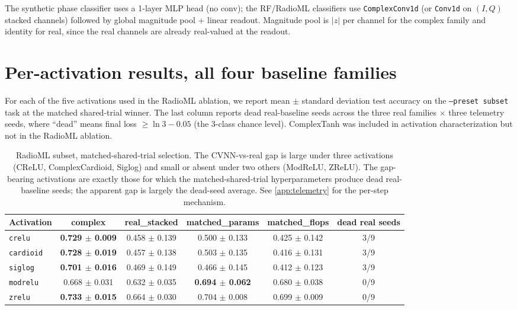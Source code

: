 \documentclass{article}
\providecommand{\Cref}[1]{\autoref{#1}}
\newcommand{\code}[1]{\texttt{#1}}
\begin{document}
The synthetic phase classifier uses a 1-layer MLP head (no conv); the
RF/RadioML classifiers use \code{ComplexConv1d} (or \code{Conv1d} on
$(I,Q)$ stacked channels) followed by global magnitude pool + linear
readout. Magnitude pool is $|z|$ per channel for the complex family
and identity for real, since the real channels are already real-valued
at the readout.

\section{Per-activation results, all four baseline families}
\label{app:per-activation-results}

For each of the five activations used in the RadioML ablation, we
report mean $\pm$ standard deviation test accuracy on the
\code{--preset subset} task at the matched shared-trial winner. The
last column reports dead real-baseline seeds across the three real
families $\times$ three telemetry seeds, where ``dead'' means final
loss $\geq \ln 3 - 0.05$ (the 3-class chance level). ComplexTanh was
included in activation characterization but not in the RadioML
ablation.

\begin{table}[h]
\centering
\small
\begin{tabular}{lccccc}
\toprule
\textbf{Activation} & \textbf{complex} & \textbf{real\_stacked} & \textbf{matched\_params} & \textbf{matched\_flops} & \textbf{dead real seeds} \\
\midrule
\code{crelu}    & \textbf{0.729 $\pm$ 0.009} & 0.458 $\pm$ 0.139 & 0.500 $\pm$ 0.133 & 0.425 $\pm$ 0.142 & 3/9 \\
\code{cardioid} & \textbf{0.728 $\pm$ 0.019} & 0.457 $\pm$ 0.138 & 0.503 $\pm$ 0.135 & 0.416 $\pm$ 0.131 & 3/9 \\
\code{siglog}   & \textbf{0.701 $\pm$ 0.016} & 0.469 $\pm$ 0.149 & 0.466 $\pm$ 0.145 & 0.412 $\pm$ 0.123 & 3/9 \\
\code{modrelu}  & 0.668 $\pm$ 0.031 & 0.632 $\pm$ 0.035 & \textbf{0.694 $\pm$ 0.062} & 0.680 $\pm$ 0.038 & 0/9 \\
\code{zrelu}    & \textbf{0.733 $\pm$ 0.015} & 0.664 $\pm$ 0.030 & 0.704 $\pm$ 0.008 & 0.699 $\pm$ 0.009 & 0/9 \\
\bottomrule
\end{tabular}
\caption{RadioML subset, matched-shared-trial selection. The
CVNN-vs-real gap is large under three activations (CReLU,
ComplexCardioid, Siglog) and small or absent under two others
(ModReLU, ZReLU). The gap-bearing activations are exactly those for
which the matched-shared-trial hyperparameters produce dead
real-baseline seeds; the apparent gap is largely the dead-seed
average. See \Cref{app:telemetry} for the per-step mechanism.}
\label{tab:per-activation}
\end{table}
\end{document}
